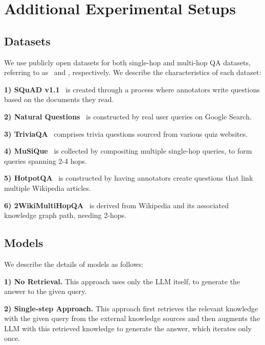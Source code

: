 \appendix


\clearpage

\section{Additional Experimental Setups}
\label{appendix:setup}


\subsection{Datasets}
We use publicly open datasets for both single-hop and multi-hop QA datasets, referring to as~\citet{DPR} and \citet{ircot}, respectively. We describe the characteristics of each dataset:

\noindent
\textbf{1) SQuAD v1.1}~\cite{squad} is created through a process where annotators write questions based on the documents they read. 

\noindent
\textbf{2) Natural Questions}~\cite{nq} is constructed by real user queries on Google Search. 

\noindent
\textbf{3) TriviaQA}~\cite{tqa} comprises trivia questions sourced from various quiz websites.

\noindent
\textbf{4) MuSiQue}~\cite{musique} is collected by compositing multiple single-hop queries, to form queries spanning 2-4 hops. 

\noindent
\textbf{5) HotpotQA}~\cite{hotpotqa} is constructed by having annotators create questions that link multiple Wikipedia articles. 

\noindent
\textbf{6) 2WikiMultiHopQA}~\cite{2hop} is derived from Wikipedia and its associated knowledge graph path, needing 2-hops.



\subsection{Models}
We describe the details of models as follows:

\noindent
\textbf{1) No Retrieval.} This approach uses only the LLM itself, to generate the answer to the given query. 

\noindent
\textbf{2) Single-step Approach.} This approach first retrieves the relevant knowledge with the given query from the external knowledge sources and then augments the LLM with this retrieved knowledge to generate the answer, which iterates only once.


